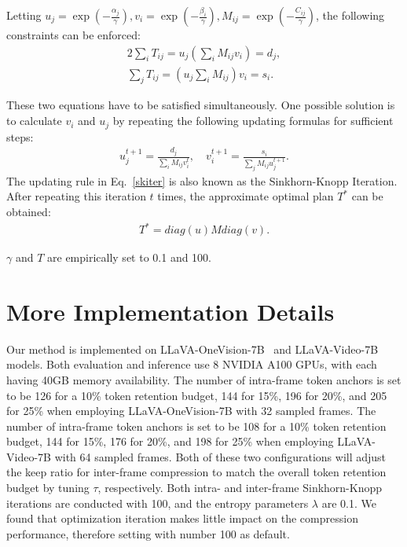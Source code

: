 Letting $u_j=\exp(-{\frac{\alpha_j}{\gamma}}), v_i=\exp(-{\frac{\beta_i}{\gamma}}), M_{ij}=\exp(-{\frac{C_{ij}}{\gamma}})$, the following constraints can be enforced:
\begin{alignat}{2}
\sum_i T_{ij}=u_j(\sum_i M_{ij}v_i)=d_j,\\
\sum_j T_{ij}=(u_j\sum_i M_{ij})v_i=s_i.
\end{alignat}

These two equations have to be satisfied simultaneously. One possible solution is to calculate $v_i$ and $u_j$ by repeating the following updating formulas for sufficient steps:
\begin{equation}
\begin{split}
u_j^{t+1}=\frac{d_j}{\sum_iM_{ij}v_i^t},\quad v_i^{t+1}=\frac{s_i}{\sum_jM_{ij}u_j^{t+1}}.
\end{split}
\label{skiter}
\end{equation}
The updating rule in Eq.~\ref{skiter} is also known as the Sinkhorn-Knopp Iteration. After repeating this iteration $t$ times, the approximate optimal plan $T^*$ can be obtained:
\begin{equation}
\begin{split}
T^* = diag(u) M diag(v).
\end{split}\label{optimal_assigning_plan}
\end{equation}

$\gamma$ and $T$ are empirically set to 0.1 and 100. 



\section{More Implementation Details}
\label{sec:more_imples}


Our method is implemented on LLaVA-OneVision-7B~\cite{li2024llava} and LLaVA-Video-7B~\cite{zhang2024video} models. Both evaluation and inference use 8 NVIDIA A100 GPUs, with each having 40GB memory availability. 
The number of intra-frame token anchors is set to be 126 for a 10\% token retention budget, 144 for 15\%, 196 for 20\%, and 205 for 25\% when employing LLaVA-OneVision-7B with 32 sampled frames. The number of intra-frame token anchors is set to be 108 for a 10\% token retention budget, 144 for 15\%, 176 for 20\%, and 198 for 25\% when employing LLaVA-Video-7B with 64 sampled frames. Both of these two configurations will adjust the keep ratio for inter-frame compression to match the overall token retention budget by tuning $\tau$, respectively. Both intra- and inter-frame Sinkhorn-Knopp iterations are conducted with 100, and the entropy parameters $\lambda$ are 0.1. We found that optimization iteration makes little impact on the compression performance, therefore setting with number 100 as default.




